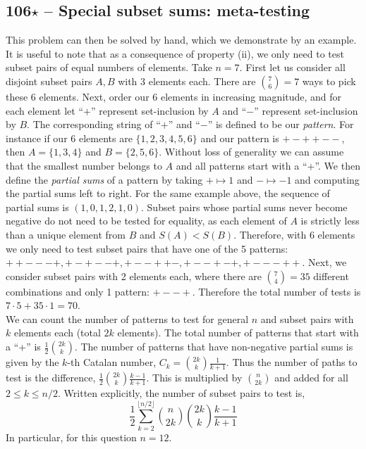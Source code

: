 \documentclass{article}
\begin{document}
\subsection*{106$\star$ -- Special subset sums: meta-testing} 
This problem can then be solved by hand, which we demonstrate by an example. 
It is useful to note that as a consequence of property (ii), we only need to test subset pairs of equal numbers of elements. 
Take $n=7$. 
First let us consider all disjoint subset pairs $A, B$ with 3 elements each. 
There are $\binom{7}{6} = 7$ ways to pick these 6 elements. 
Next, order our 6 elements in increasing magnitude, and for each element let ``$+$'' represent set-inclusion by $A$ and ``$-$'' represent set-inclusion by $B$. 
The corresponding string of ``$+$'' and ``$-$'' is defined to be our \textit{pattern}. 
For instance if our 6 elements are $\{1, 2, 3, 4, 5, 6\}$ and our pattern is $+-++--$, then $A = \{1, 3, 4\}$ and $B = \{2, 5, 6\}$. 
Without loss of generality we can assume that the smallest number belongs to $A$ and all patterns start with a ``$+$''. 
We then define the \textit{partial sums} of a pattern by taking $+ \mapsto 1$ and $- \mapsto -1$ and computing the partial sums left to right. 
For the same example above, the sequence of partial sums is $(1, 0, 1, 2, 1, 0)$. 
Subset pairs whose partial sums never become negative do not need to be tested for equality, as each element of $A$ is strictly less than a unique element from $B$ and $S(A) < S(B)$. 
Therefore, with 6 elements we only need to test subset pairs that have one of the 5 patterns: $++---+, +-+--+, +--++-, +--+-+, +---++$. 
Next, we consider subset pairs with 2 elements each, where there are $\binom{7}{4}=35$ different combinations and only 1 pattern: $+--+$. 
Therefore the total number of tests is $7\cdot5 + 35\cdot1 = 70$.\\

We can count the number of patterns to test for general $n$ and subset pairs with $k$ elements each (total $2k$ elements). 
The total number of patterns that start with a ``+'' is $\frac{1}{2}\binom{2k}{k}$. 
The number of patterns that have non-negative partial sums is given by the $k$-th Catalan number, $C_k = \binom{2k}{k} \frac{1}{k+1}$. 
Thus the number of paths to test is the difference, $\frac{1}{2}\binom{2k}{k} \frac{k-1}{k+1}$. 
This is multiplied by $\binom{n}{2k}$ and added for all $2 \leq k \leq n/2$. 
Written explicitly, the number of subset pairs to test is,
$$\boxed{ \frac{1}{2}\sum_{k=2}^{\lfloor{n/2}\rfloor} \binom{n}{2k} \binom{2k}{k} \frac{k-1}{k+1} }$$
In particular, for this question $n = 12$.
\end{document}
